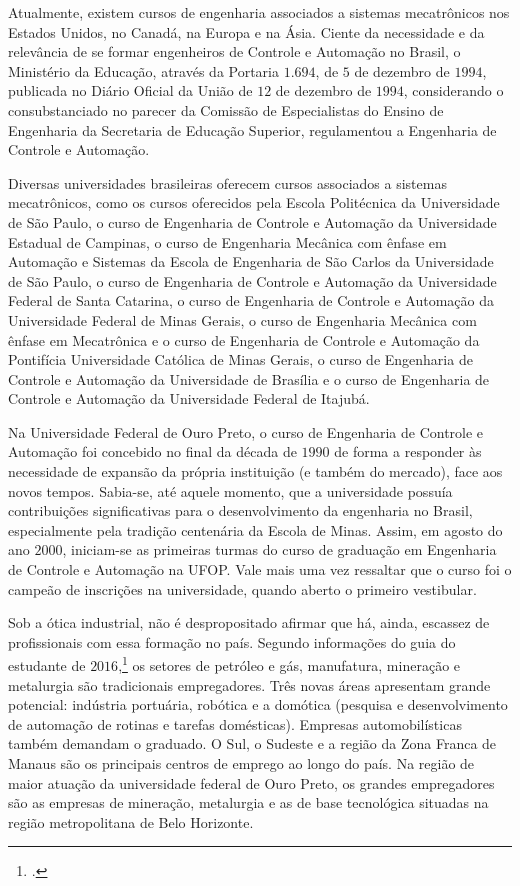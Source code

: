 \documentclass[
	12pt,				%
	openright,			%
	oneside,			%
	a4paper,			%
	english,			%
	brazil				%
	]{abntex2}
\begin{document}
Atualmente, existem cursos de engenharia associados a sistemas mecatrônicos nos Estados Unidos, no Canadá, na Europa e na Ásia. Ciente da necessidade e da relevância de se formar engenheiros de Controle e Automação no Brasil, o Ministério da Educação, através da Portaria $1.694$, de $5$ de dezembro de $1994$, publicada no Diário Oficial da União de $12$ de dezembro de $1994$, considerando o consubstanciado no parecer da Comissão de Especialistas do Ensino de Engenharia da Secretaria de Educação Superior, regulamentou a Engenharia de Controle e Automação.

Diversas universidades brasileiras oferecem cursos associados a sistemas mecatrônicos, como os cursos oferecidos pela Escola Politécnica da Universidade de São Paulo, o curso de Engenharia de Controle e Automação da Universidade Estadual de Campinas, o curso de Engenharia Mecânica com ênfase em Automação e Sistemas da Escola de Engenharia de São Carlos da Universidade de São Paulo, o curso de Engenharia de Controle e Automação da Universidade Federal de Santa Catarina, o curso de Engenharia de Controle e Automação da Universidade Federal de Minas Gerais, o curso de Engenharia Mecânica com ênfase em Mecatrônica e o curso de Engenharia de Controle e Automação da Pontifícia Universidade Católica de Minas Gerais, o curso de Engenharia de Controle e Automação da Universidade de Brasília e o curso de Engenharia de Controle e Automação da Universidade Federal de Itajubá.

Na Universidade Federal de Ouro Preto, o curso de Engenharia de Controle e Automação foi concebido no final da década de $1990$ de forma a responder às necessidade de expansão da própria instituição (e também do mercado), face aos novos tempos. Sabia-se, até aquele momento, que a universidade possuía contribuições significativas para o desenvolvimento da engenharia no Brasil, especialmente pela tradição centenária da Escola de Minas. Assim, em agosto do ano $2000$, iniciam-se as primeiras turmas do curso de graduação em Engenharia de Controle e Automação na UFOP. Vale mais uma vez ressaltar que o curso foi o campeão de inscrições na universidade, quando aberto o primeiro vestibular.

Sob a ótica industrial, não é despropositado afirmar que há, ainda, escassez de profissionais com essa formação no país. Segundo informações do guia do estudante de $2016$,\footcite{guia-do-estudante} os setores de petróleo e gás, manufatura, mineração e metalurgia são tradicionais empregadores. Três novas áreas apresentam grande potencial: indústria portuária, robótica e a domótica (pesquisa e desenvolvimento de automação de rotinas e tarefas domésticas). Empresas automobilísticas também demandam o graduado. O Sul, o Sudeste e a região da Zona Franca de Manaus são os principais centros de emprego ao longo do país. Na região de maior atuação da universidade federal de Ouro Preto, os grandes empregadores são as empresas de mineração, metalurgia e as de base tecnológica situadas na região metropolitana de Belo Horizonte.
\end{document}
